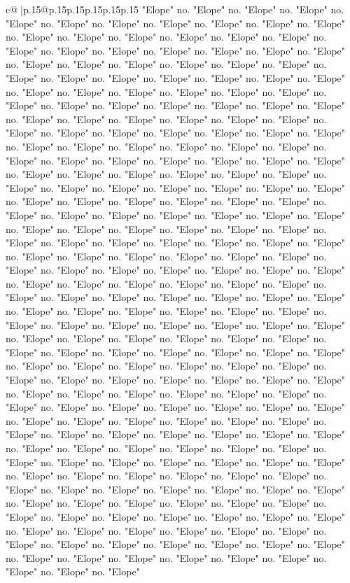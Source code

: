 \documentclass{article}
\begin{document}
{\begin{supertabular}{c@{$\;$}|p{.15\linewidth}@{}p{.15\linewidth}p{.15\linewidth}p{.15\linewidth}p{.15\linewidth}p{.15\linewidth}}
{{{"Elope" no. "Elope" no. "Elope" no. "Elope" no. "Elope" no. "Elope" no. "Elope" no. "Elope" no. "Elope" no. "Elope" no. "Elope" no. "Elope" no. "Elope" no. "Elope" no. "Elope" no. "Elope" no. "Elope" no. "Elope" no. "Elope" no. "Elope" no. "Elope" no. "Elope" no. "Elope" no. "Elope" no. "Elope" no. "Elope" no. "Elope" no. "Elope" no. "Elope" no. "Elope" no. "Elope" no. "Elope" no. "Elope" no. "Elope" no. "Elope" no. "Elope" no. "Elope" no. "Elope" no. "Elope" no. "Elope" no. "Elope" no. "Elope" no. "Elope" no. "Elope" no. "Elope" no. "Elope" no. "Elope" no. "Elope" no. "Elope" no. "Elope" no. "Elope" no. "Elope" no. "Elope" no. "Elope" no. "Elope" no. "Elope" no. "Elope" no. "Elope" no. "Elope" no. "Elope" no. "Elope" no. "Elope" no. "Elope" no. "Elope" no. "Elope" no. "Elope" no. "Elope" no. "Elope" no. "Elope" no. "Elope" no. "Elope" no. "Elope" no. "Elope" no. "Elope" no. "Elope" no. "Elope" no. "Elope" no. "Elope" no. "Elope" no. "Elope" no. "Elope" no. "Elope" no. "Elope" no. "Elope" no. "Elope" no. "Elope" no. "Elope" no. "Elope" no. "Elope" no. "Elope" no. "Elope" no. "Elope" no. "Elope" no. "Elope" no. "Elope" no. "Elope" no. "Elope" no. "Elope" no. "Elope" no. "Elope" no. "Elope" no. "Elope" no. "Elope" no. "Elope" no. "Elope" no. "Elope" no. "Elope" no. "Elope" no. "Elope" no. "Elope" no. "Elope" no. "Elope" no. "Elope" no. "Elope" no. "Elope" no. "Elope" no. "Elope" no. "Elope" no. "Elope" no. "Elope" no. "Elope" no. "Elope" no. "Elope" no. "Elope" no. "Elope" no. "Elope" no. "Elope" no. "Elope" no. "Elope" no. "Elope" no. "Elope" no. "Elope" no. "Elope" no. "Elope" no. "Elope" no. "Elope" no. "Elope" no. "Elope" no. "Elope" no. "Elope" no. "Elope" no. "Elope" no. "Elope" no. "Elope" no. "Elope" no. "Elope" no. "Elope" no. "Elope" no. "Elope" no. "Elope" no. "Elope" no. "Elope" no. "Elope" no. "Elope" no. "Elope" no. "Elope" no. "Elope" no. "Elope" no. "Elope" no. "Elope" no. "Elope" no. "Elope" no. "Elope" no. "Elope" no. "Elope" no. "Elope" no. "Elope" no. "Elope" no. "Elope" no. "Elope" no. "Elope" no. "Elope" no. "Elope" no. "Elope" no. "Elope" no. "Elope" no. "Elope" no. "Elope" no. "Elope" no. "Elope" no. "Elope" no. "Elope" no. "Elope" no. "Elope" no. "Elope" no. "Elope" no. "Elope" no. "Elope" no. "Elope" no. "Elope" no. "Elope" no. "Elope" no. "Elope" no. "Elope" no. "Elope" no. "Elope" no. "Elope" no. "Elope" no. "Elope" no. "Elope" no. "Elope" no. "Elope" no. "Elope" no. "Elope" no. "Elope" no. "Elope" no. "Elope" no. "Elope" no. "Elope" no. "Elope" no. "Elope" no. "Elope" no. "Elope" no. "Elope" no. "Elope" no. "Elope" no. "Elope" no. "Elope" no. "Elope" no. "Elope" no. "Elope" no. "Elope" no. "Elope" no. "Elope" no. "Elope" no. "Elope" no. "Elope" no. "Elope" no. "Elope" no. "Elope" no. "Elope" no. "Elope" no. "Elope" no. "Elope" no. "Elope" no. "Elope" no. "Elope" no. "Elope" no. "Elope" no. "Elope" no. "Elope" no. "Elope" no. "Elope" no. "Elope" no. "Elope" no. "Elope" no. "Elope" no. "Elope" no. "Elope" no. "Elope" no. "Elope" no. "Elope" no. "Elope" no. "Elope" no. "Elope" no. "Elope" no. "Elope" no. "Elope" no. "Elope" no. "Elope" no. "Elope" no. "Elope" no. "Elope" no. "Elope" no. "Elope" no. "Elope" no. "Elope" }}}
\end{supertabular}}
\end{document}
